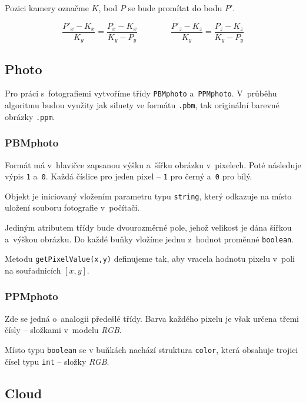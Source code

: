 \documentclass[12pt]{report}			%
\begin{document}
                       Pozici kamery označme $K$, bod $P$ se bude promítat do bodu $P'$.

                        $$\frac{P'_x-K_x}{K_y}=\frac{P_x-K_x}{K_y-P_y}
                        \qquad \qquad
                          \frac{P'_z-K_z}{K_y}=\frac{P_z-K_z}{K_y-P_y} 
                        $$






                \subsection{Photo}

                    Pro práci s~fotografiemi vytvoříme třídy \verb|PBMphoto| a~\verb|PPMphoto|. V~průběhu algoritmu budou využity jak siluety ve formátu \verb|.pbm|, tak originální barevné obrázky \verb|.ppm|.

                    \subsubsection{PBMphoto}
                        Formát má v~hlavičce zapsanou výšku a~šířku obrázku v~pixelech. Poté následuje výpis \verb|1| a~\verb|0|. Každá číslice pro jeden pixel -- \verb|1| pro černý a~\verb|0| pro bílý.
    
                        Objekt je iniciovaný vložením parametru typu \verb|string|, který odkazuje na místo uložení souboru fotografie v~počítači.
    
                        Jediným atributem třídy bude dvourozměrné pole, jehož velikost je dána šířkou a~výškou obrázku. Do každé buňky vložíme jednu z~hodnot proměnné \verb|boolean|.
    
                        Metodu \verb|getPixelValue(x,y)| definujeme tak, aby vracela hodnotu pixelu v~poli na souřadnicích $[x,y]$.

                    \subsubsection{PPMphoto}
                        Zde se jedná o~analogii předešlé třídy. Barva každého pixelu je však určena třemi čísly -- složkami v~modelu \emph{RGB}.
    
                        Místo typu \verb|boolean| se v buňkách nachází struktura \verb|color|, která obsahuje trojici čísel typu \verb|int| -- složky \emph{RGB}.

    	        \subsection{Cloud}
\end{document}
